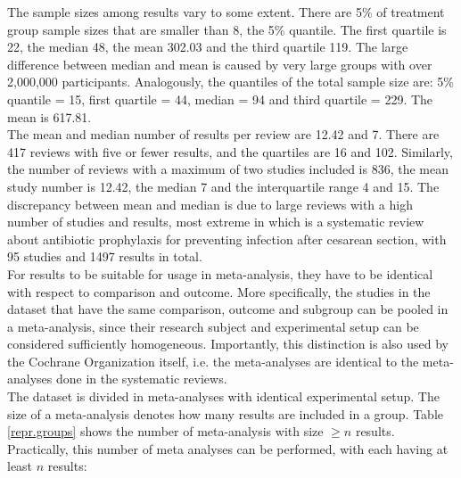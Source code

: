 The sample sizes among results vary to some extent. There are 5\% of treatment group sample sizes that are smaller than 8, the 5\% quantile. The first quartile is 22, the median 48, the mean 302.03 and the third quartile 119. The large difference between median and mean is caused by very large groups with over 2,000,000 participants. Analogously, the quantiles of the total sample size are: 5\% quantile = 15, first quartile = 44, median = 94 and third quartile = 229. The mean is 617.81. \\
The mean and median number of results per review are 12.42 and 7. There are 417 reviews with five or fewer results, and the quartiles are 16 and 102. Similarly, the number of reviews with a maximum of two studies included is 836, the mean study number is 12.42, the median 7 and the interquartile range 4 and 15. The discrepancy between mean and median is due to large reviews with a high number of studies and results, most extreme in \citet{largest.review} which is a systematic review about antibiotic prophylaxis for preventing infection after cesarean section, with 95 studies and 1497 results in total. \\
For results to be suitable for usage in meta-analysis, they have to be identical with respect to comparison and outcome. More specifically, the studies in the dataset that have the same comparison, outcome and subgroup can be pooled in a meta-analysis, since their research subject and experimental setup can be considered sufficiently homogeneous. Importantly, this distinction is also used by the Cochrane Organization itself, i.e. the meta-analyses are identical to the meta-analyses done in the systematic reviews.\\%
The dataset is divided in meta-analyses with identical experimental setup. The size of a meta-analysis denotes how many results are included in a group.
Table \ref{repr.groups} shows the number of meta-analysis with size $\geq n$ results. Practically, this number of meta analyses can be performed, with each having at least $n$ results:

